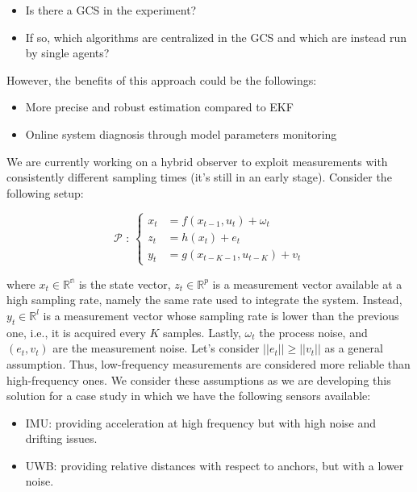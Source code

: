 \begin{itemize}
    \item Is there a GCS in the experiment?
    \item If so, which algorithms are centralized in the GCS and which are instead run by single agents?    
\end{itemize}

However, the benefits of this approach could be the followings:

\begin{itemize}
    \item More precise and robust estimation compared to EKF
    \item Online system diagnosis through model parameters monitoring
\end{itemize}

\newline
We are currently working on a hybrid observer to exploit measurements with consistently different sampling times (it's still in an early stage). Consider the following setup: 

\begin{equation}
    \label{eqn:multirate_ss}
    \mathcal{P} \text{ : }    
    \begin{cases}
        x_t &= f(x_{t-1},u_t) + \omega_t \\
        z_t &= h(x_t) + e_t \\
        y_{t} &= g(x_{t-K-1},u_{t-K}) + v_t
    \end{cases}
\end{equation}

where $x_t\in\mathbb{R^n}$ is the state vector, $z_t\in\mathbb{R}^p$ is a measurement vector available at a high sampling rate, namely the same rate used to integrate the system. Instead, $y_t\in\mathbb{R}^l$ is a measurement vector whose sampling rate is lower than the previous one, i.e., it is acquired every $K$ samples. Lastly, $\omega_t$ the process noise, and $(e_t,v_t)$ are the measurement noise. Let's consider $||e_t|| \geq ||v_t||$ as a general assumption. Thus, low-frequency measurements are considered more reliable than high-frequency ones. We consider these assumptions as we are developing this solution for a case study in which we have the following sensors available: 

\begin{itemize}
    \item IMU: providing acceleration at high frequency but with high noise and drifting issues.
    \item UWB: providing relative distances with respect to anchors, but with a lower noise.
\end{itemize}

